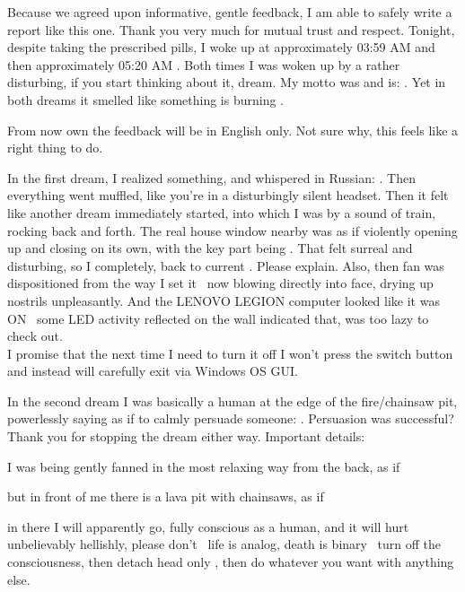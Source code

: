 Because we agreed upon informative, gentle feedback, I am able to safely write a report like this one. Thank you very much for mutual trust and respect. Tonight, despite taking the prescribed pills, I woke up at approximately 03:59 AM  and then approximately 05:20 AM . Both times I was woken up by a rather disturbing, if you start thinking about it, dream. My motto was and is: . Yet in both dreams it smelled like something is burning .

From now own the feedback will be in English only. Not sure why, this feels like a right thing to do.

In the first dream, I realized something, and whispered in Russian:  . Then everything went muffled, like you're in a disturbingly silent headset. Then it felt like another dream immediately started, into which I was  by a sound of train, rocking back and forth. The real house window nearby was as if violently opening up and closing on its own, with the key part being . That felt surreal and disturbing, so I  completely, back to current . Please explain. Also, then fan was dispositioned from the way I set it \emdash\ now blowing directly into face, drying up nostrils unpleasantly. And the LENOVO LEGION computer looked like it was ON \emdash\ some LED activity reflected on the wall indicated that, was too lazy to check out. \\
I promise that the next time I need to turn it off I won't press the switch button and instead will carefully exit via Windows OS GUI.

In the second dream I was basically a human at the edge of the fire/chainsaw pit, powerlessly saying as if to calmly persuade someone: . Persuasion was successful? Thank you for stopping the dream either way. Important details: \startperec
  \item I was being gently fanned in the most relaxing way from the back, as if 
  \item but in front of me there is a lava pit with chainsaws, as if 
  \item in there I will apparently go, fully conscious as a human, and it will hurt unbelievably hellishly, please don't \emdash\ life is analog, death is binary \emdash\ turn off the consciousness, then detach head only , then do whatever you want with anything else.
  \stopperec

